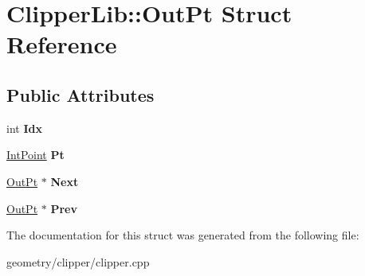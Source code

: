 \hypertarget{struct_clipper_lib_1_1_out_pt}{}\section{Clipper\+Lib\+:\+:Out\+Pt Struct Reference}
\label{struct_clipper_lib_1_1_out_pt}
\subsection*{Public Attributes}
\begin{DoxyCompactItemize}
\item 
\mbox{\label{struct_clipper_lib_1_1_out_pt_ad04d3691d47a5d0d9b2ae097e7e7bf10}} 
int {\bfseries Idx}
\item 
\mbox{\label{struct_clipper_lib_1_1_out_pt_aa01c2b1e9c5b2d8faa40701178ffcf98}} 
\mbox{\hyperlink{struct_clipper_lib_1_1_int_point}{Int\+Point}} {\bfseries Pt}
\item 
\mbox{\label{struct_clipper_lib_1_1_out_pt_a2d605b87f6da37dbdbef990c4fa5819e}} 
\mbox{\hyperlink{struct_clipper_lib_1_1_out_pt}{Out\+Pt}} $\ast$ {\bfseries Next}
\item 
\mbox{\label{struct_clipper_lib_1_1_out_pt_a609eb414d5764e78150cceccaffc5d54}} 
\mbox{\hyperlink{struct_clipper_lib_1_1_out_pt}{Out\+Pt}} $\ast$ {\bfseries Prev}
\end{DoxyCompactItemize}


The documentation for this struct was generated from the following file\+:\begin{DoxyCompactItemize}
\item 
geometry/clipper/clipper.\+cpp\end{DoxyCompactItemize}
